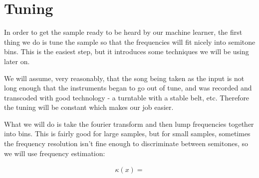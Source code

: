 \section{Tuning}

In order to get the sample ready to be heard by our machine learner, the first thing we do is tune the sample so that the frequencies will fit nicely into semitone bins.
This is the easiest step, but it introduces some techniques we will be using later on.

We will assume, very reasonably, that the song being taken as the input is not long enough that the instruments began to go out of tune, and was recorded and transcoded with good technology - a turntable with a stable belt, etc. 
Therefore the tuning will be constant which makes our job easier.

What we will do is take the fourier transform and then lump frequencies together into bins. 
This is fairly good for large samples, but for small samples, sometimes the frequency resolution isn't fine enough to discriminate between semitones, so we will use frequency estimation:

\begin{align*}
  \kappa(x) = 
\end{align*}
